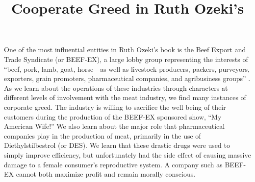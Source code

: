 \documentclass{article}
\title{Cooperate Greed in Ruth Ozeki's \citetitle{ozeki1998my}}
\begin{document}
\makeheader

One of the most influential entities in Ruth Ozeki's book
 is the Beef Export and Trade Syndicate (or BEEF-EX),
a large lobby group representing the interests of ``beef, pork, lamb, goat,
horse—as well as livestock producers, packers, purveyors, exporters, grain
promoters, pharmaceutical companies, and agribusiness groups'' \cite[Ch.
1]{ozeki1998my}. As we learn about the operations of these industries
through characters at different levels of involvement with the meat
industry, we find many instances of corporate greed. The industry is willing
to sacrifice the well being of their customers during the production of the
BEEF-EX sponsored show, ``My American Wife!'' We also learn about the major
role that pharmaceutical companies play in the production of meat, primarily
in the use of Diethylstilbestrol (or DES). We learn that these drastic drugs
were used to simply improve efficiency, but unfortunately had the side
effect of causing massive damage to a female consumer's reproductive system.
A company such as BEEF-EX cannot both maximize profit and remain morally
conscious.



%
\end{document}
